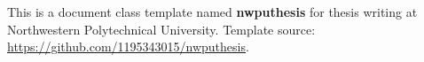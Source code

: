 

\begin{abstract}
    这是一个适用于西北工业大学学位论文写作的文档类模板 \textbf{nwputhesis}，模板来源：\url{https://github.com/1195343015/nwputhesis}。
\end{abstract}

\begin{engabstract}
    This is a document class template named \textbf{nwputhesis} for thesis writing at Northwestern Polytechnical University. Template source: \url{https://github.com/1195343015/nwputhesis}.
\end{engabstract}
